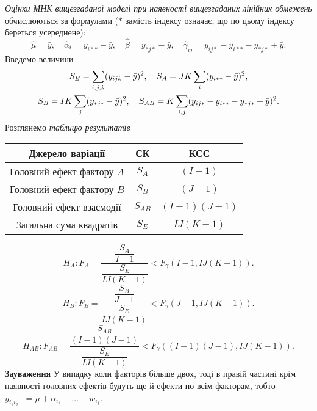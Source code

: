 \textit{Оцінки МНК вищезгаданої моделі при наявності вищезгаданих лінійних обмежень} обчислюються за формулами ($*$ замість індексу означає, що по цьому індексу береться усереднене): \[ \widehat{\mu} = \bar{y}, \quad \widehat{\alpha}_i = y_{i**} - \bar{y}, \quad \widehat{\beta} = y_{*j*} - \bar{y}, \quad \widehat{\gamma}_{ij} =y_{ij*} - y_{i**} - y_{*j*} + \bar{y}.\]
Введемо величини 
\begin{multline*}
S_E = \displaystyle\sum\limits_{i,j,k}(y_{ijk}-\bar{y})^2, \quad S_A = JK\displaystyle\sum\limits_i(y_{i**}-\bar{y})^2, \\
S_B = IK\displaystyle\sum\limits_j(y_{*j*}-\bar{y})^2, \quad S_{AB} = K\displaystyle\sum\limits_{i,j}(y_{ij*} - y_{i**} - y_{*j*} + \bar{y})^2. 
\end{multline*}
Розглянемо \textit{таблицю результатів}
\begin{table}[H]
	\centering
	\begin{tabular}{|c|c|c|}
	\hline
	Джерело варіації & СК & КСС \\
 \hline
	Головний ефект фактору $A$ & $S_A$ & $(I-1)$ \\
 \hline
	Головний ефект фактору $B$ & $S_B$ & $(J-1)$ \\
 \hline
	Головний ефект взаємодії & $S_{AB}$ & $(I-1)(J-1)$ \\
 \hline
	Загальна сума квадратів & $S_E$ & $IJ(K-1)$ \\
 \hline
	\end{tabular}
\end{table}
\[ H_A: F_A = \dfrac{\dfrac{S_A}{I-1}}{\dfrac{S_E}{IJ(K-1)}} < F_\gamma(I-1,IJ(K-1)). \]
\[ H_B: F_B = \dfrac{\dfrac{S_B}{J-1}}{\dfrac{S_E}{IJ(K-1)}} < F_\gamma(J-1,IJ(K-1)). \]
\[ H_{AB}: F_{AB} = \dfrac{\dfrac{S_{AB}}{(I-1)(J-1)}}{\dfrac{S_E}{IJ(K-1)}} < F_\gamma((I-1)(J-1),IJ(K-1)). \]
\textbf{Зауваження} У випадку коли факторів більше двох, тоді в правій частині крім наявності головних ефектів будуть ще й ефекти по всім факторам, тобто $y_{i_1i_2\ldots}=\mu+\alpha_{i_1}+\ldots+w_{i_f}$.